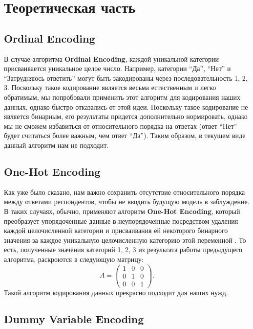 \section{Теоретическая часть} \label{sec:theory}
\subsection{Ordinal Encoding}

В случае алгоритма {\bf Ordinal Encoding}, каждой уникальной категории присваивается уникальное целое число.
Например, категории \enquote{Да}, \enquote{Нет} и \enquote{Затрудняюсь ответить} могут быть закодированы через последовательность 1, 2, 3.
Поскольку такое кодирование является весьма естественным и легко обратимым, мы попробовали применить этот алгоритм для кодирования наших данных, однако быстро отказались от этой идеи.
Поскольку такое кодирование не является бинарным, его результаты придется дополнительно нормировать, однако мы не сможем избавиться от относительного порядка на ответах (ответ \enquote{Нет} будет считаться более важным, чем ответ \enquote{Да}).
Таким образом, в текущем виде данный алгоритм нам не подходит.

\subsection{One-Hot Encoding}

Как уже было сказано, нам важно сохранить отсутствие относительного порядка между ответами респондентов, чтобы не вводить будущую модель в заблуждение.
В таких случаях, обычно, применяют алгоритм {\bf One-Hot Encoding}, который преобразует упорядоченные данные в неупорядоченные посредством удаления каждой целочисленной категории и присваивания ей некоторого бинарного значения за каждое уникальную целочисленную категорию этой переменной \cite{feature-eng}.
То есть, полученные значения категорий 1, 2, 3 из результата работы предыдущего алгоритма, раскроются в следующую матрицу:
\[
    A = \begin{pmatrix}
        1 & 0 & 0 \\
        0 & 1 & 0 \\
        0 & 0 & 1
    \end{pmatrix}.
\]
Такой алгоритм кодирования данных прекрасно подходит для наших нужд.

\subsection{Dummy Variable Encoding}

